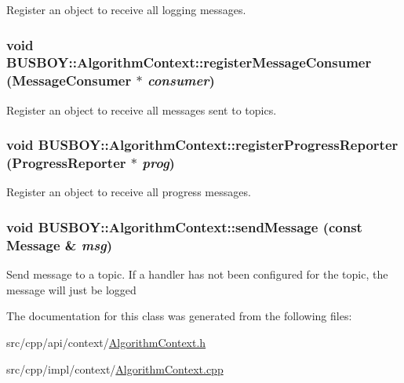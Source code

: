Register an object to receive all logging messages. \hypertarget{classBUSBOY_1_1AlgorithmContext_ae2bdc8d592cbadcd8cf5b8f55244c804}{
\subsubsection[{registerMessageConsumer}]{\setlength{\rightskip}{0pt plus 5cm}void BUSBOY::AlgorithmContext::registerMessageConsumer ({\bf MessageConsumer} $\ast$ {\em consumer})}}
\label{classBUSBOY_1_1AlgorithmContext_ae2bdc8d592cbadcd8cf5b8f55244c804}


Register an object to receive all messages sent to topics. \hypertarget{classBUSBOY_1_1AlgorithmContext_ada0123d7af4b630548725cbff1ad606a}{
\subsubsection[{registerProgressReporter}]{\setlength{\rightskip}{0pt plus 5cm}void BUSBOY::AlgorithmContext::registerProgressReporter ({\bf ProgressReporter} $\ast$ {\em prog})}}
\label{classBUSBOY_1_1AlgorithmContext_ada0123d7af4b630548725cbff1ad606a}


Register an object to receive all progress messages. \hypertarget{classBUSBOY_1_1AlgorithmContext_a9874aa4a2bec24d137e5bf9d33ec8919}{
\subsubsection[{sendMessage}]{\setlength{\rightskip}{0pt plus 5cm}void BUSBOY::AlgorithmContext::sendMessage (const {\bf Message} \& {\em msg})}}
\label{classBUSBOY_1_1AlgorithmContext_a9874aa4a2bec24d137e5bf9d33ec8919}


Send message to a topic. If a handler has not been configured for the topic, the message will just be logged 

The documentation for this class was generated from the following files:\begin{DoxyCompactItemize}
\item 
src/cpp/api/context/\hyperlink{AlgorithmContext_8h}{AlgorithmContext.h}\item 
src/cpp/impl/context/\hyperlink{AlgorithmContext_8cpp}{AlgorithmContext.cpp}\end{DoxyCompactItemize}
